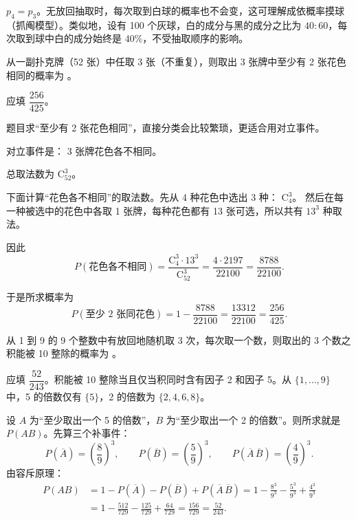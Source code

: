 ﻿\documentclass[lang=cn,11pt]{elegantbook}
\begin{document}
\begin{note}
\(p_4 = p_3\)。无放回抽取时，每次取到白球的概率也不会变，这可理解成依概率摸球（抓阄模型）。类似地，设有 100 个灰球，白的成分与黑的成分之比为 \(40:60\)，每次取到球中白的成分始终是 \(40\%\)，不受抽取顺序的影响。
\end{note}

\begin{exercise}\label{exer:1-26}
从一副扑克牌（52 张）中任取 3 张（不重复），则取出 3 张牌中至少有 2 张花色相同的概率为 \underline{\hspace{2cm}}。
\end{exercise}

\begin{solution}
应填 \(\dfrac{256}{425}\)。

题目求“至少有 2 张花色相同”，直接分类会比较繁琐，更适合用对立事件。

对立事件是：
\(\text{3 张牌花色各不相同}\)。

总取法数为 \(\mathrm C_{52}^{3}\)。

下面计算“花色各不相同”的取法数。先从 4 种花色中选出 3 种：
\(\mathrm C_4^3\)。
然后在每一种被选中的花色中各取 1 张牌，每种花色都有 13 张可选，所以共有
\(13^3\)
种取法。

因此
\[
P(\text{花色各不相同})
=\frac{\mathrm C_4^3\cdot 13^3}{\mathrm C_{52}^{3}}
=\frac{4\cdot 2197}{22100}
=\frac{8788}{22100}.
\]

于是所求概率为
\[
P(\text{至少 2 张同花色})
=1-\frac{8788}{22100}
=\frac{13312}{22100}
=\frac{256}{425}.
\]
\end{solution}


\begin{exercise}[提高]\label{exer:1-51}
从 1 到 9 的 9 个整数中有放回地随机取 3 次，每次取一个数，则取出的 3 个数之积能被 10 整除的概率为 \underline{\hspace{2cm}}。
\end{exercise}

\begin{solution}
应填 \(\dfrac{52}{243}\)。积能被 10 整除当且仅当积同时含有因子 2 和因子 5。从 \(\{1,\dots,9\}\) 中，5 的倍数仅有 \(\{5\}\)，2 的倍数为 \(\{2,4,6,8\}\)。

设 \(A\) 为“至少取出一个 5 的倍数”，\(B\) 为“至少取出一个 2 的倍数”。则所求就是 \(P(AB)\)。先算三个补事件：
\[
P(\overline A)=\left(\frac89\right)^3,\qquad P(\overline B)=\left(\frac59\right)^3,\qquad P(\overline A\,\overline B)=\left(\frac49\right)^3.
\]
由容斥原理：
\begin{align*}
P(AB) &= 1 - P(\overline{A}) - P(\overline{B}) + P(\overline{A}\,\overline{B}) = 1 - \frac{8^3}{9^3} - \frac{5^3}{9^3} + \frac{4^3}{9^3} \\
&= 1 - \frac{512}{729} - \frac{125}{729} + \frac{64}{729} = \frac{156}{729} = \frac{52}{243}.
\end{align*}
\end{solution}
\end{document}
